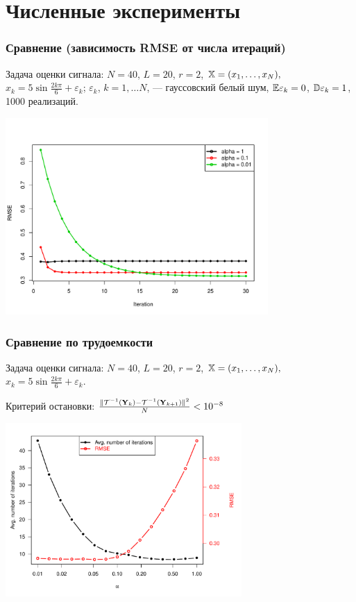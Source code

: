 \documentclass[unicode, notheorems]{beamer}
\begin{document}
\section{Численные эксперименты}
\begin{frame}
	\frametitle{Сравнение (зависимость RMSE от числа итераций)}
	Задача оценки сигнала: $N = 40$, $L = 20$, $r = 2$, $\mathbb{X} = (x_{1}, \ldots, x_N),$  $x_k = 5\sin{\frac{2 k \pi}{6}} + \varepsilon_k$; $\varepsilon_k$, $k = 1, \ldots N$, --- гауссовский белый шум, $\mathbb{E} \varepsilon_k = 0$, $\mathbb{D} \varepsilon_k = 1$, 1000 реализаций.
	
	\vspace{-1cm}
	\begin{center}
		\includegraphics*[width = 10cm]{threealphas.pdf}
	\end{center}
\end{frame}

\begin{frame}
	\frametitle{Сравнение по трудоемкости}
	Задача оценки сигнала: $N = 40$, $L = 20$, $r = 2$, $\mathbb{X} = (x_{1}, \ldots, x_N),$  $x_k = 5\sin{\frac{2 k \pi}{6}} + \varepsilon_k$.
	
	Критерий остановки: $\frac{\|\mathcal{T}^{-1}(\mathbf{Y}_k) - \mathcal{T}^{-1}(\mathbf{Y}_{k + 1})\|^2}{N} < 10^{-8}$
	\vspace{-0.4cm}
	\begin{center}
		\includegraphics*[width = 9cm]{2axis.pdf}
	\end{center}
\end{frame}
\end{document}
